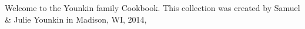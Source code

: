 Welcome to the Younkin family Cookbook.  This collection was created
by Samuel \& Julie Younkin in Madison, WI, 2014,
